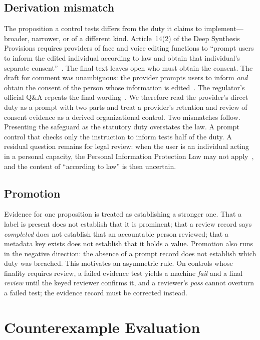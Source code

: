 \documentclass[sigconf,review,anonymous]{acmart}
\begin{document}
\subsection{Derivation mismatch}

The proposition a control tests differs from the duty it claims to implement---broader, narrower, or of a different kind. Article~14(2) of the Deep Synthesis Provisions requires providers of face and voice editing functions to ``prompt users to inform the edited individual according to law and obtain that individual's separate consent''~\cite{deepSynthesisProvisions2022}. The final text leaves open who must obtain the consent. The draft for comment was unambiguous: the provider prompts users to inform \emph{and} obtain the consent of the person whose information is edited~\cite{deepSynthesisDraft2022}. The regulator's official Q\&A repeats the final wording~\cite{deepSynthesisQA2022}. We therefore read the provider's direct duty as a prompt with two parts and treat a provider's retention and review of consent evidence as a derived organizational control. Two mismatches follow. Presenting the safeguard as the statutory duty overstates the law. A prompt control that checks only the instruction to inform tests half of the duty. A residual question remains for legal review: when the user is an individual acting in a personal capacity, the Personal Information Protection Law may not apply~\cite{pipl2021}, and the content of ``according to law'' is then uncertain.

\subsection{Promotion}

Evidence for one proposition is treated as establishing a stronger one. That a label is present does not establish that it is prominent; that a review record says \emph{completed} does not establish that an accountable person reviewed; that a metadata key exists does not establish that it holds a value. Promotion also runs in the negative direction: the absence of a prompt record does not establish which duty was breached. This motivates an asymmetric rule. On controls whose finality requires review, a failed evidence test yields a machine \emph{fail} and a final \emph{review} until the keyed reviewer confirms it, and a reviewer's \emph{pass} cannot overturn a failed test; the evidence record must be corrected instead.

\section{Counterexample Evaluation}
\end{document}
